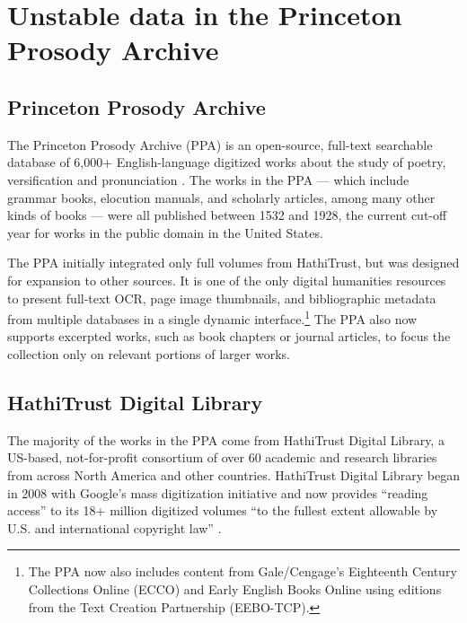 \documentclass[final]{anthology-ch} %
\begin{document}
\section{Unstable data in the Princeton Prosody Archive}

\subsection{Princeton Prosody Archive }

The Princeton Prosody Archive (PPA) is an open-source, full-text searchable database of 6,000+ English-language digitized works about the study of poetry, versification and pronunciation \cite{noauthor_princeton_nodate}. The works in the PPA — which include grammar books, elocution manuals, and scholarly articles, among many other kinds of books — were all published between 1532 and 1928, the current cut-off year for works in the public domain in the United States.

The PPA initially integrated only full volumes from HathiTrust, but was designed for expansion to other sources. It is one of the only digital humanities resources to present full-text OCR, page image thumbnails, and bibliographic metadata from multiple databases in a single dynamic interface.\footnote{The PPA now also includes content from Gale/Cengage’s Eighteenth Century Collections Online (ECCO) and Early English Books Online using editions from the Text Creation Partnership (EEBO-TCP).} The PPA also now supports excerpted works, such as book chapters or journal articles, to focus the collection only on relevant portions of larger works.

\subsection{HathiTrust Digital Library}

The majority of the works in the PPA come from HathiTrust Digital Library, a US-based, not-for-profit consortium of over 60 academic and research libraries from across North America and other countries. HathiTrust Digital Library began in 2008 with Google’s mass digitization initiative and now provides ``reading access'' to its 18+ million digitized volumes ``to the fullest extent allowable by U.S. and international copyright law'' \cite{noauthor_welcome_nodate}.
\end{document}
